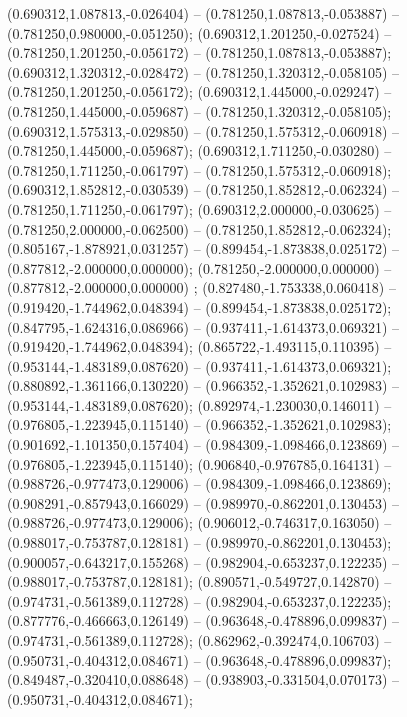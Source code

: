  (0.690312,1.087813,-0.026404) -- (0.781250,1.087813,-0.053887) -- (0.781250,0.980000,-0.051250);
 (0.690312,1.201250,-0.027524) -- (0.781250,1.201250,-0.056172) -- (0.781250,1.087813,-0.053887);
 (0.690312,1.320312,-0.028472) -- (0.781250,1.320312,-0.058105) -- (0.781250,1.201250,-0.056172);
 (0.690312,1.445000,-0.029247) -- (0.781250,1.445000,-0.059687) -- (0.781250,1.320312,-0.058105);
 (0.690312,1.575313,-0.029850) -- (0.781250,1.575312,-0.060918) -- (0.781250,1.445000,-0.059687);
 (0.690312,1.711250,-0.030280) -- (0.781250,1.711250,-0.061797) -- (0.781250,1.575312,-0.060918);
 (0.690312,1.852812,-0.030539) -- (0.781250,1.852812,-0.062324) -- (0.781250,1.711250,-0.061797);
 (0.690312,2.000000,-0.030625) -- (0.781250,2.000000,-0.062500) -- (0.781250,1.852812,-0.062324);
 (0.805167,-1.878921,0.031257) -- (0.899454,-1.873838,0.025172) -- (0.877812,-2.000000,0.000000);
 (0.781250,-2.000000,0.000000) -- (0.877812,-2.000000,0.000000) ;
 (0.827480,-1.753338,0.060418) -- (0.919420,-1.744962,0.048394) -- (0.899454,-1.873838,0.025172);
 (0.847795,-1.624316,0.086966) -- (0.937411,-1.614373,0.069321) -- (0.919420,-1.744962,0.048394);
 (0.865722,-1.493115,0.110395) -- (0.953144,-1.483189,0.087620) -- (0.937411,-1.614373,0.069321);
 (0.880892,-1.361166,0.130220) -- (0.966352,-1.352621,0.102983) -- (0.953144,-1.483189,0.087620);
 (0.892974,-1.230030,0.146011) -- (0.976805,-1.223945,0.115140) -- (0.966352,-1.352621,0.102983);
 (0.901692,-1.101350,0.157404) -- (0.984309,-1.098466,0.123869) -- (0.976805,-1.223945,0.115140);
 (0.906840,-0.976785,0.164131) -- (0.988726,-0.977473,0.129006) -- (0.984309,-1.098466,0.123869);
 (0.908291,-0.857943,0.166029) -- (0.989970,-0.862201,0.130453) -- (0.988726,-0.977473,0.129006);
 (0.906012,-0.746317,0.163050) -- (0.988017,-0.753787,0.128181) -- (0.989970,-0.862201,0.130453);
 (0.900057,-0.643217,0.155268) -- (0.982904,-0.653237,0.122235) -- (0.988017,-0.753787,0.128181);
 (0.890571,-0.549727,0.142870) -- (0.974731,-0.561389,0.112728) -- (0.982904,-0.653237,0.122235);
 (0.877776,-0.466663,0.126149) -- (0.963648,-0.478896,0.099837) -- (0.974731,-0.561389,0.112728);
 (0.862962,-0.392474,0.106703) -- (0.950731,-0.404312,0.084671) -- (0.963648,-0.478896,0.099837);
 (0.849487,-0.320410,0.088648) -- (0.938903,-0.331504,0.070173) -- (0.950731,-0.404312,0.084671);
